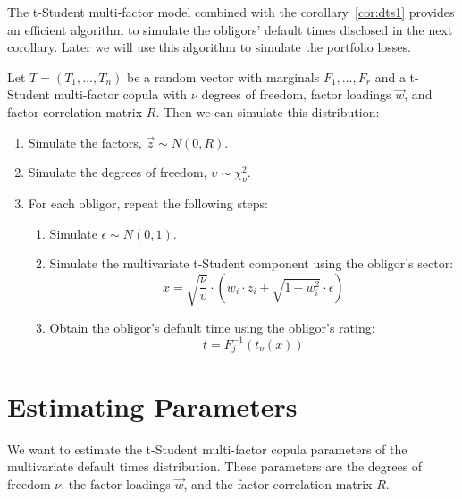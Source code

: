 \documentclass[11pt,fleqn]{book} %
\begin{document}
The t-Student multi-factor model combined with the corollary~\ref{cor:dts1} 
provides an efficient algorithm to simulate the obligors' default times 
disclosed in the next corollary. Later we will use this algorithm to simulate
the portfolio losses.

\begin{corollary}
	\label{cor:dts2}
	Let $T=(T_1, \dots, T_n)$ be a random vector with marginals 
	$F_1, \dots, F_r$ and a t-Student multi-factor copula with 
	$\nu$ degrees of freedom, factor loadings $\vec{w}$, and factor correlation 
	matrix $R$. Then we can simulate this distribution:
	\begin{enumerate}
		\item Simulate the factors, $\vec{z} \sim N(0,R)$.
		\item Simulate the degrees of freedom, $\upsilon \sim \chi_{\nu}^2$.
		\item For each obligor, repeat the following steps:
		\begin{enumerate}
			\item Simulate $\epsilon \sim N(0,1)$.
			\item Simulate the multivariate t-Student component using the obligor's sector:
			\begin{displaymath}
				x = \sqrt{\frac{\nu}{\upsilon}} \cdot \left( w_i \cdot z_i + \sqrt{1-w_i^2} \cdot \epsilon \right)
			\end{displaymath}
			\item Obtain the obligor's default time using the obligor's rating:
			\begin{displaymath}
				t = F_j^{-1}\left(t_{\nu}(x)\right)
			\end{displaymath}
		\end{enumerate}
	\end{enumerate}
\end{corollary}


\chapter{Estimating Parameters}
\label{chap:estimation}

We want to estimate the t-Student multi-factor copula parameters of the 
multivariate default times distribution. These parameters are the degrees of 
freedom $\nu$, the factor loadings $\vec{w}$, and the factor correlation 
matrix $R$.
\end{document}
